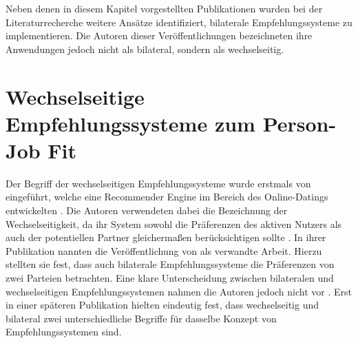 Neben denen in diesem Kapitel vorgestellten Publikationen wurden bei der Literaturrecherche weitere Ansätze identifiziert, bilaterale Empfehlungssysteme zu implementieren. Die Autoren dieser Veröffentlichungen bezeichneten ihre Anwendungen jedoch nicht als bilateral, sondern als wechselseitig. %

\section{Wechselseitige Empfehlungssysteme zum Person-Job Fit}
\label{ch:verwandteArbeiten:nichtAufDemPEFitBasierendeBilateraleSysteme}
Der Begriff der wechselseitigen Empfehlungssysteme wurde erstmals von \textcite[S. 1]{pizzato:2010} eingeführt, welche eine Recommender Engine im Bereich des Online-Datings entwickelten \cite[S. 1]{wenxing:2015}. Die Autoren verwendeten dabei die Bezeichnung der Wechselseitigkeit, da ihr System sowohl die Präferenzen des aktiven Nutzers als auch der potentiellen Partner gleichermaßen berücksichtigen sollte \cite[S. 1]{pizzato:2010}. In ihrer Publikation nannten \textcite[S. 3]{pizzato:2010} die Veröffentlichung von \textcite[S. 1ff.]{malinowski:2006} als verwandte Arbeit. Hierzu stellten sie fest, dass auch bilaterale Empfehlungssysteme die Präferenzen von zwei Parteien betrachten. Eine klare Unterscheidung zwischen bilateralen und wechselseitigen Empfehlungssystemen nahmen die Autoren jedoch nicht vor \cite[S. 3]{pizzato:2010}. Erst in einer späteren Publikation hielten \textcite[S. 8]{pizzato:2013} eindeutig fest, dass wechselseitig und bilateral zwei unterschiedliche Begriffe für dasselbe Konzept von Empfehlungssystemen sind.

